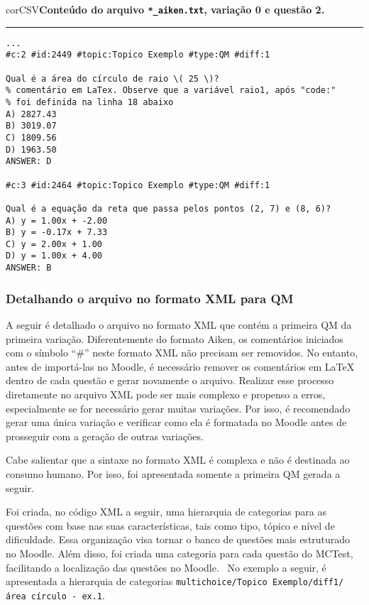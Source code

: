 \begin{myboxCode}{corCSV}{\textbf{Conteúdo do arquivo \texttt{*\_aiken.txt}, variação 0 e questão 2.}}\vspace{3mm}
\hrule
\begin{verbatim}
...
#c:2 #id:2449 #topic:Topico Exemplo #type:QM #diff:1

Qual é a área do círculo de raio \( 25 \)?
% comentário em LaTex. Observe que a variável raio1, após "code:" 
% foi definida na linha 18 abaixo
A) 2827.43
B) 3019.07
C) 1809.56
D) 1963.50
ANSWER: D

#c:3 #id:2464 #topic:Topico Exemplo #type:QM #diff:1

Qual é a equação da reta que passa pelos pontos (2, 7) e (8, 6)?
A) y = 1.00x + -2.00
B) y = -0.17x + 7.33
C) y = 2.00x + 1.00
D) y = 1.00x + 4.00
ANSWER: B
\end{verbatim}
\end{myboxCode}

\subsubsection{Detalhando o arquivo no formato XML para QM}

A seguir é detalhado o arquivo no formato XML que contém a primeira QM da primeira variação. Diferentemente do formato Aiken, os comentários iniciados com o símbolo ``\#'' neste formato XML não precisam ser removidos. No entanto, antes de importá-las no Moodle, é necessário remover os comentários em \LaTeX{} dentro de cada questão e gerar novamente o arquivo. Realizar esse processo diretamente no arquivo XML pode ser mais complexo e propenso a erros, especialmente se for necessário gerar muitas variações. Por isso, é recomendado gerar uma única variação e verificar como ela é formatada no Moodle antes de prosseguir com a geração de outras variações.

Cabe salientar que a sintaxe no formato XML é complexa e não é destinada ao consumo humano. Por isso, foi apresentada somente a primeira QM gerada a seguir.

Foi criada, no código XML a seguir, uma hierarquia de categorias para as questões com base nas suas características, tais como tipo, tópico e nível de dificuldade. Essa organização visa tornar o banco de questões mais estruturado no Moodle. Além disso, foi criada uma categoria para cada questão do MCTest, facilitando a localização das questões no Moodle.
\
No exemplo a seguir, é apresentada a hierarquia de categorias  \verb|multichoice/Topico Exemplo/diff1/área círculo - ex.1|.


